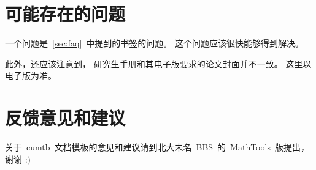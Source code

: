 	\section{可能存在的问题}

	一个问题是~\ref{sec:faq}~中提到的书签的问题。
	这个问题应该很快能够得到解决。

	此外，还应该注意到，
	研究生手册\supercite{F13}和其电子版要求的论文封面并不一致。
	这里以电子版为准。

	\section{反馈意见和建议}

	关于~cumtb~文档模板的意见和建议请到北大未名~BBS~的~MathTools~版提出，
	谢谢 :)

